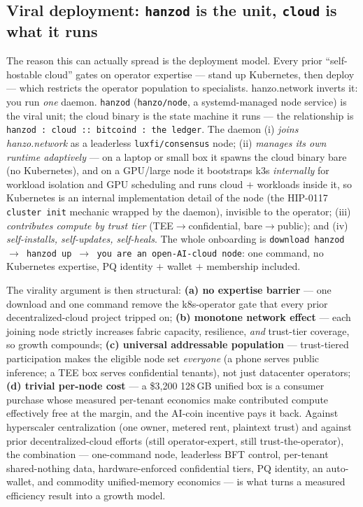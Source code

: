 \documentclass[11pt]{article}
\begin{document}
\subsection{Viral deployment: \texttt{hanzod} is the unit, \texttt{cloud} is what it runs}
\label{sec:viral}
The reason this can actually spread is the deployment model. Every prior ``self-hostable cloud''
gates on operator expertise --- stand up Kubernetes, then deploy --- which restricts the operator
population to specialists. hanzo.network inverts it: you run \emph{one} daemon. \texttt{hanzod}
(\texttt{hanzo/node}, a systemd-managed node service) is the viral unit; the cloud binary is the
state machine it runs --- the relationship is \texttt{hanzod : cloud :: bitcoind : the ledger}. The
daemon (i) \emph{joins hanzo.network} as a leaderless \texttt{luxfi/consensus} node; (ii)
\emph{manages its own runtime adaptively} --- on a laptop or small box it spawns the cloud binary
bare (no Kubernetes), and on a GPU/large node it bootstraps k3s \emph{internally} for workload
isolation and GPU scheduling and runs cloud $+$ workloads inside it, so Kubernetes is an internal
implementation detail of the node (the HIP-0117~\cite{hip0117} \texttt{cluster init} mechanic
wrapped by the daemon), invisible to the operator; (iii) \emph{contributes compute by trust tier}
(TEE$\to$confidential, bare$\to$public); and (iv) \emph{self-installs, self-updates, self-heals}.
The whole onboarding is \texttt{download hanzod $\to$ hanzod up $\to$ you are an open-AI-cloud
node}: one command, no Kubernetes expertise, PQ identity $+$ wallet $+$ membership included.

The virality argument is then structural: \textbf{(a) no expertise barrier} --- one download and
one command remove the k8s-operator gate that every prior decentralized-cloud project tripped on;
\textbf{(b) monotone network effect} --- each joining node strictly increases fabric capacity,
resilience, \emph{and} trust-tier coverage, so growth compounds; \textbf{(c) universal addressable
population} --- trust-tiered participation makes the eligible node set \emph{everyone} (a phone
serves public inference; a TEE box serves confidential tenants), not just datacenter operators;
\textbf{(d) trivial per-node cost} --- a \$3{,}200 128\,GB unified box is a consumer purchase whose
measured per-tenant economics make contributed compute effectively free at the margin, and the
AI-coin incentive pays it back. Against hyperscaler centralization (one owner, metered rent,
plaintext trust) and against prior decentralized-cloud efforts (still operator-expert, still
trust-the-operator), the combination --- one-command node, leaderless BFT control, per-tenant
shared-nothing data, hardware-enforced confidential tiers, PQ identity, an auto-wallet, and
commodity unified-memory economics --- is what turns a measured efficiency result into a growth
model.
\end{document}
